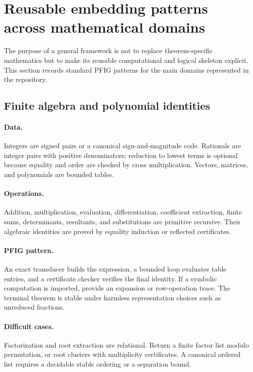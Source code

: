 \section{Reusable embedding patterns across mathematical domains}
\label{sec:domains}

The purpose of a general framework is not to replace theorem-specific mathematics but to make its reusable computational and logical skeleton explicit.  This section records standard PFIG patterns for the main domains represented in the repository.

\subsection{Finite algebra and polynomial identities}

\paragraph{Data.}
Integers are signed pairs or a canonical sign-and-magnitude code.  Rationals are integer pairs with positive denominators; reduction to lowest terms is optional because equality and order are checked by cross multiplication.  Vectors, matrices, and polynomials are bounded tables.

\paragraph{Operations.}
Addition, multiplication, evaluation, differentiation, coefficient extraction, finite sums, determinants, resultants, and substitutions are primitive recursive.  Their algebraic identities are proved by equality induction or reflected certificates.

\paragraph{PFIG pattern.}
An exact transducer builds the expression, a bounded loop evaluates table entries, and a certificate checker verifies the final identity.  If a symbolic computation is imported, provide an expansion or row-operation trace.  The terminal theorem is stable under harmless representation choices such as unreduced fractions.

\paragraph{Difficult cases.}
Factorization and root extraction are relational.  Return a finite factor list modulo permutation, or root clusters with multiplicity certificates.  A canonical ordered list requires a decidable stable ordering or a separation bound.

